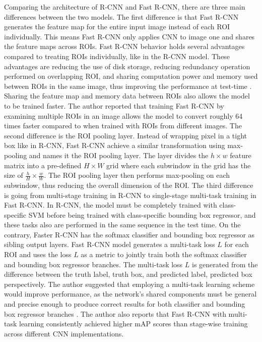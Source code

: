 Comparing the architecture of R-CNN and Fast R-CNN, there are three main differences between the two models. The first difference is that Fast R-CNN generates the feature map for the entire input image instead of each ROI individually. This means Fast R-CNN only applies CNN to image one and shares the feature maps across ROIs. Fast R-CNN behavior holds several advantages compared to treating ROIs individually, like in the R-CNN model. These advantages are reducing the use of disk storage, reducing redundancy operation performed on overlapping ROI, and sharing computation power and memory used between ROIs in the same image, thus improving the performance at test-time \cite{fast_rcnn_og}. Sharing the feature map and memory data between ROIs also allows the model to be trained faster. The author reported that training Fast R-CNN by examining multiple ROIs in an image allows the model to convert roughly 64 times faster compared to when trained with ROIs from different images. The second difference is the ROI pooling layer. Instead of wrapping pixel in a tight box like in R-CNN, Fast R-CNN achieve a similar transformation using max-pooling and names it the ROI pooling layer. The layer divides the $h \times w$ feature matrix into a pre-defined $H \times W$ grid where each subwindow in the grid has the size of $\frac{h}{H} \times \frac{w}{W}$. The ROI pooling layer then performs max-pooling on each subwindow, thus reducing the overall dimension of the ROI. The third difference is going from multi-stage training in R-CNN to single-stage multi-task training in Fast R-CNN. In R-CNN, the model must be completely trained with class-specific SVM before being trained with class-specific bounding box regressor, and these tasks also are performed in the same sequence in the test time. On the contrary, Faster R-CNN has the softmax classifier and bounding box regressor as sibling output layers. Fast R-CNN model generates a multi-task loss $L$ for each ROI and uses the loss $L$ as a metric to jointly train both the softmax classifier and bounding box regressor branches. The multi-task loss $L$ is generated from the difference between the truth label, truth box, and predicted label, predicted box perspectively. The author suggested that employing a multi-task learning scheme would improve performance, as the network's shared components must be general and precise enough to produce correct results for both classifier and bounding box regressor branches \cite{fast_rcnn_og}. The author also reports that Fast R-CNN with multi-task learning consistently achieved higher mAP scores than stage-wise training across different CNN implementations.


